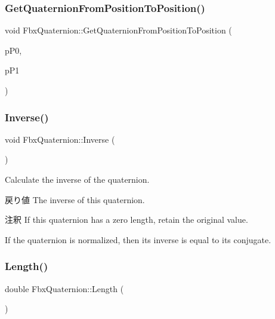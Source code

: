 \subsubsection{\texorpdfstring{Get\+Quaternion\+From\+Position\+To\+Position()}{GetQuaternionFromPositionToPosition()}}
{\footnotesize\ttfamily void Fbx\+Quaternion\+::\+Get\+Quaternion\+From\+Position\+To\+Position (\begin{DoxyParamCaption}\item[{const \hyperlink{class_fbx_vector4}{Fbx\+Vector4} \&}]{p\+P0,  }\item[{const \hyperlink{class_fbx_vector4}{Fbx\+Vector4} \&}]{p\+P1 }\end{DoxyParamCaption})}

\mbox{\label{class_fbx_quaternion_ad7656dae6b9ee5bc42f48a9217dafcbd}} 
\subsubsection{\texorpdfstring{Inverse()}{Inverse()}}
{\footnotesize\ttfamily void Fbx\+Quaternion\+::\+Inverse (\begin{DoxyParamCaption}{ }\end{DoxyParamCaption})}

Calculate the inverse of the quaternion. \begin{DoxyReturn}{戻り値}
The inverse of this quaternion. 
\end{DoxyReturn}
\begin{DoxyRemark}{注釈}
If this quaternion has a zero length, retain the original value. 

If the quaternion is normalized, then its inverse is equal to its conjugate. 
\end{DoxyRemark}
\mbox{\label{class_fbx_quaternion_a90afe720e7f779480d6cf0af97367a8d}} 
\subsubsection{\texorpdfstring{Length()}{Length()}}
{\footnotesize\ttfamily double Fbx\+Quaternion\+::\+Length (\begin{DoxyParamCaption}{ }\end{DoxyParamCaption})}

